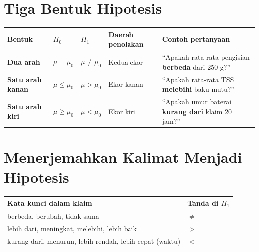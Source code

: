 \documentclass[
  indonesian,
  letterpaper,
]{book}
\newcounter{none} %
\begin{document}
\section{Tiga Bentuk Hipotesis}\label{tiga-bentuk-hipotesis}

{\def\LTcaptype{none} %
\begin{longtable}[]{@{}
  >{\raggedright\arraybackslash}p{}
  >{\raggedright\arraybackslash}p{}
  >{\raggedright\arraybackslash}p{}
  >{\raggedright\arraybackslash}p{}
  >{\raggedright\arraybackslash}p{}@{}}
\toprule\noalign{}
\begin{minipage}[b]{\linewidth}\raggedright
Bentuk
\end{minipage} & \begin{minipage}[b]{\linewidth}\raggedright
\(H_0\)
\end{minipage} & \begin{minipage}[b]{\linewidth}\raggedright
\(H_1\)
\end{minipage} & \begin{minipage}[b]{\linewidth}\raggedright
Daerah penolakan
\end{minipage} & \begin{minipage}[b]{\linewidth}\raggedright
Contoh pertanyaan
\end{minipage} \\
\midrule\noalign{}
\endhead
\bottomrule\noalign{}
\endlastfoot
\textbf{Dua arah} & \(\mu = \mu_0\) & \(\mu \neq \mu_0\) & Kedua ekor &
``Apakah rata-rata pengisian \textbf{berbeda} dari 250 g?'' \\
\textbf{Satu arah kanan} & \(\mu \leq \mu_0\) & \(\mu > \mu_0\) & Ekor
kanan & ``Apakah rata-rata TSS \textbf{melebihi} baku mutu?'' \\
\textbf{Satu arah kiri} & \(\mu \geq \mu_0\) & \(\mu < \mu_0\) & Ekor
kiri & ``Apakah umur baterai \textbf{kurang dari} klaim 20 jam?'' \\
\end{longtable}
}

\section{Menerjemahkan Kalimat Menjadi
Hipotesis}\label{menerjemahkan-kalimat-menjadi-hipotesis}

{\def\LTcaptype{none} %
\begin{longtable}[]{@{}ll@{}}
\toprule\noalign{}
Kata kunci dalam klaim & Tanda di \(H_1\) \\
\midrule\noalign{}
\endhead
\bottomrule\noalign{}
\endlastfoot
berbeda, berubah, tidak sama & \(\neq\) \\
lebih dari, meningkat, melebihi, lebih baik & \(>\) \\
kurang dari, menurun, lebih rendah, lebih cepat (waktu) & \(<\) \\
\end{longtable}
}
\end{document}
